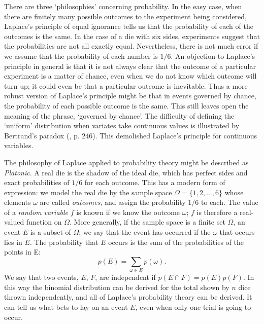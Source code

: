 There are three `philosophies' concerning probability. 
In the easy case, when there are finitely many possible outcomes to the
experiment being considered, 
Laplace's principle of equal ignorance tells us
that the probability of each of the outcomes is the same. In the case of a
die with six sides, experiments suggest that the probabilities are not all
exactly equal. Nevertheless, there is
not much error if we assume that the probability of each number is $1/6$.
An objection to Laplace's principle in general is that it is
not always clear that the outcome of a particular experiment is a matter
of chance, even when we do not know which outcome
will turn up; it could even be that a particular outcome is inevitable. Thus
a more robust version of Laplace's principle might be that in events
governed by chance, the probability of each possible outcome is the same.
This still leaves open the meaning of the phrase, `governed by chance'.
The difficulty of defining the `uniform' distribution when variates take
continuous values is illustrated by Bertrand's paradox (\cite{Decker},
p. 246). This demolished Laplace's principle for continuous variables.


The philosophy of Laplace applied to probability theory might be described as
{\em Platonic}. A real die is the shadow of the ideal die, which has
perfect sides and exact probabilities of $1/6$ for each outcome. This
has a modern form of expression: we model the real die by the sample space
$\Omega=\{1,2,\ldots,6\}$ whose elements $\omega$ are called {\em outcomes},
and assign the probability $1/6$ to each. The value of a {\em random
variable} $f$ is known if we know the outcome $\omega$; $f$ is
therefore a real-valued function on $\Omega$.
More generally, if the sample space is a finite set $\Omega$, an event $E$
is a subset of $\Omega$; we say that the event has occurred
if the $\omega$ that occurs lies in $E$. The probability that $E$ occurs
is the sum of the probabilities of the points in E:
\begin{equation}
p(E)=\sum_{\omega\in E}p(\omega).
\end{equation}
We say that two events, $E$, $F$, are independent if $p(E\cap F)=p(E)p(F)$.
In this way the binomial distribution can be derived for the total shown
by $n$ dice thrown independently, and all of Laplace's probability theory
can be derived. It can tell us what bets to lay on an event $E$, even
when only one trial is going to occur.

